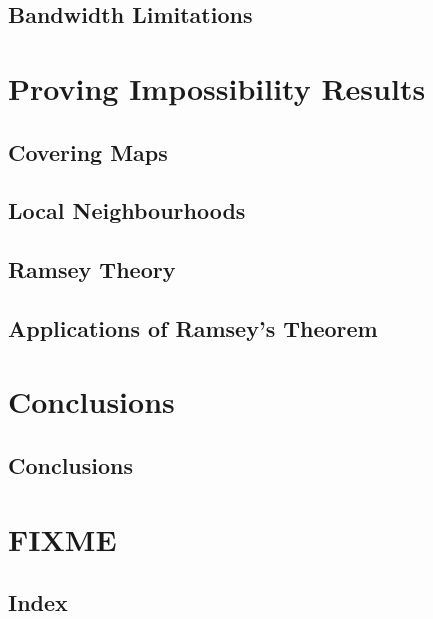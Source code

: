 \chapter{Bandwidth Limitations}


\part{Proving Impossibility Results}

\chapter{Covering Maps}\label{ch:covering-map}


\chapter{Local Neighbourhoods}\label{ch:local-neighbourhoods}


\chapter{Ramsey Theory}


\chapter{Applications of Ramsey's Theorem}


\part{Conclusions}

\chapter{Conclusions}


\part{FIXME}


\backmatter

\chapter{Index}


\renewcommand{\bibsection}{\chapter{\bibname}}




